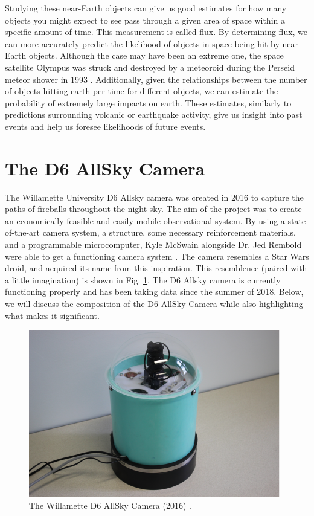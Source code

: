 Studying these near-Earth objects can give us good estimates for how many objects you might expect to see pass through a given area of space within a specific amount of time. 
This measurement is called flux.
By determining flux, we can more accurately predict the likelihood of objects in space being hit by near-Earth objects. 
Although the case may have been an extreme one, the space satellite Olympus was struck and destroyed by a meteoroid during the Perseid meteor shower in 1993 \cite{threat}.
Additionally, given the relationships between the number of objects hitting earth per time for different objects, we can estimate the probability of extremely large impacts on earth.
These estimates, similarly to predictions surrounding volcanic or earthquake activity, give us insight into past events and help us foresee likelihoods of future events.








\section{The D6 AllSky Camera}

The Willamette University D6 Allsky camera was created in 2016 to capture the paths of fireballs throughout the night sky. 
The aim of the project was to create an economically feasible and easily mobile observational system.
By using a state-of-the-art camera system, a structure, some necessary reinforcement materials, and a programmable microcomputer, Kyle McSwain alongside Dr. Jed Rembold were able to get a functioning camera system \cite{mcswain_using_2016}. 
The camera resembles a Star Wars droid, and acquired its name from this inspiration.
This resemblence (paired with a little imagination) is shown in Fig. \ref{droid}.
The D6 Allsky camera is currently functioning properly and has been taking data since the summer of 2018.  
Below, we will discuss the composition of the D6 AllSky Camera while also highlighting what makes it significant.

\begin{figure}[ht!]
  \centering
  \includegraphics[scale=0.7]{images/allsky_camera.png}
  \caption{The Willamette D6 AllSky Camera (2016) \cite{mcswain_using_2016}.}
  \label{droid}
\end{figure}

